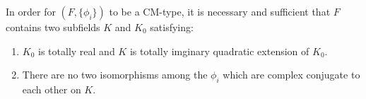 \documentclass[12pt]{article}
\begin{document}
\begin{prop}
    In order for $(F, \{\phi_i\})$ to be a CM-type, it is necessary and sufficient that $F$ contains two subfields $K$ and $K_0$ satisfying:
    \begin{enumerate}
        \item $K_0$ is totally real and $K$ is totally imginary quadratic extension of $K_0$. 
        \item There are no two isomorphisms among the $\phi_i$ which are complex conjugate to each other on $K$. 
    \end{enumerate}
\end{prop}













\end{document}
